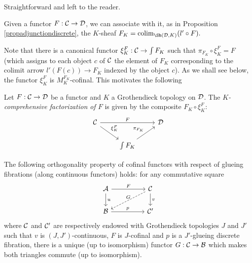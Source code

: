 \documentclass[a4paper,12pt]{article}
\begin{document}
\begin{proofs}
	Straightforward and left to the reader.
\end{proofs}

Given a functor $F:{\cal C}\to {\cal D}$, we can associate with it, as in Proposition \ref{propadjunctiondiscrete}, the $K$-sheaf 
$F_{K}=\textup{colim}_{\Sh({\cal D}, K)}(l'\circ F).$

Note that there is a canonical functor $\xi^{F}_{K}:{\cal C}\to {\int F_{K}}$ such that $\pi_{F_{K}}\circ \xi^{F}_{K}=F$ (which assigns to each object $c$ of $\cal C$ the element of $F_{K}$ corresponding to the colimit arrow $l'(F(c))\to F_{K}$ indexed by the object $c$). As we shall see below, the functor $\xi^{F}_{K}$ is $M^{F_{K}}_{K}$-cofinal. This motivates the following 

\begin{definition}
Let $F:{\cal C}\to {\cal D}$ be a functor and $K$ a Grothendieck topology  on $\cal D$. The \emph{$K$-comprehensive factorization of $F$} is given by the composite $F_{K}\circ \xi^{F}_{K}$:
\begin{equation*}
\begin{tikzcd}
{\cal C} \arrow[rr, "F"]   \arrow[dr, "\xi^{F}_{K}"]   & &  {\cal D}           \\
&  \int F_{K} \ar[ur, "\pi_{F_{K}}"] &  
\end{tikzcd}
\end{equation*}	
\end{definition} 
 

\begin{proposition}\label{proporthogonality}
	The following orthogonality property of cofinal functors with respect of glueing fibrations (along continuous functors) holds: for any commutative square
	\begin{equation*}
	\begin{tikzcd}
	{\cal A} \arrow[rr, "F"]   \arrow[d, "u"]   & &  {\cal C} \arrow[d, "v"] \arrow[dll, dashed, "G"{above}]  \\
	{\cal B} \ar[rr, "p"] & & {\cal C}'   
	\end{tikzcd}
	\end{equation*}	
	where $\cal C$ and ${\cal C}'$ are respectively endowed with Grothendieck topologies $J$ and $J'$ such that $v$ is $(J, J')$-continuous, $F$ is $J$-cofinal and $p$ is a $J'$-glueing discrete fibration, there is a unique (up to isomorphism) functor $G:{\cal C}\to {\cal B}$ which makes both triangles commute (up to isomorphism). 
\end{proposition} 
 
\end{document}
